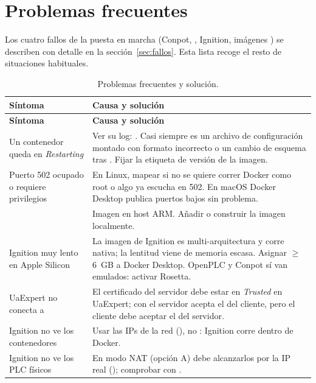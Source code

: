 \chapter{Problemas frecuentes}
\label{cap:problemas}

Los cuatro fallos de la puesta en marcha (Conpot, , Ignition, imágenes ) se describen con detalle en la sección~\ref{sec:fallos}. Esta lista recoge el resto de situaciones habituales.

\begin{longtable}{L{4.6cm} L{10.8cm}}
\caption{Problemas frecuentes y solución.}\label{tab:problemas}\\
\toprule
\textbf{Síntoma} & \textbf{Causa y solución} \\
\midrule
\endfirsthead
\toprule
\textbf{Síntoma} & \textbf{Causa y solución} \\
\midrule
\endhead
\bottomrule
\endfoot
Un contenedor queda en \emph{Restarting} & Ver su log: . Casi siempre es un archivo de configuración montado con formato incorrecto o un cambio de esquema tras . Fijar la etiqueta de versión de la imagen. \\
Puerto 502 ocupado o requiere privilegios & En Linux, mapear  si no se quiere correr Docker como root o algo ya escucha en 502. En macOS Docker Desktop publica puertos bajos sin problema. \\
 & Imagen  en host ARM. Añadir  o construir la imagen localmente. \\
Ignition muy lento en Apple Silicon & La imagen de Ignition es multi-arquitectura y corre nativa; la lentitud viene de memoria escasa. Asignar $\geq$6~GB a Docker Desktop. OpenPLC y Conpot sí van emulados: activar Rosetta. \\
UaExpert no conecta a  & El certificado del servidor debe estar en \emph{Trusted} en UaExpert; con  el servidor acepta el del cliente, pero el cliente debe aceptar el del servidor. \\
Ignition no ve los contenedores & Usar las IPs de la red \lab{} (), no : Ignition corre dentro de Docker. \\
Ignition no ve los PLC físicos & En modo NAT (opción A) debe alcanzarlos por la IP real (); comprobar con . \\

\end{longtable}
